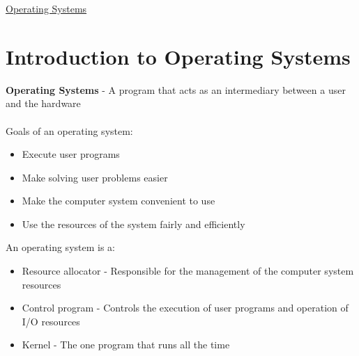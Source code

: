 \documentclass{article}[18pt]
\begin{document}
\begin{center}
\underline{\huge Operating Systems}
\end{center}
\section{Introduction to Operating Systems}
\textbf{Operating Systems} - A program that acts as an intermediary between a user and the hardware\\
\\
Goals of an operating system:
\begin{itemize}
	\item Execute user programs
	\item Make solving user problems easier
	\item Make the computer system convenient to use
	\item Use the resources of the system fairly and efficiently
\end{itemize}
An operating system is a:
\begin{itemize}
	\item Resource allocator - Responsible for the management of the computer system resources
	\item Control program - Controls the execution of user programs and operation of I/O resources
	\item Kernel - The one program that runs all the time
\end{itemize}
\end{document}
